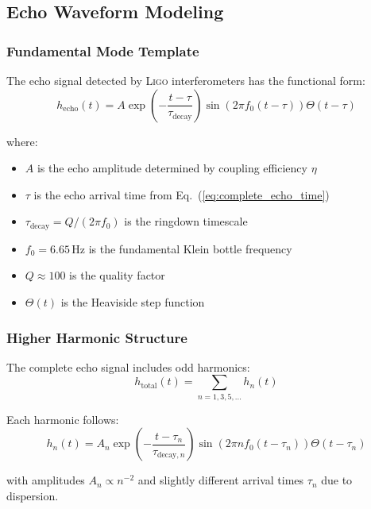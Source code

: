 \documentclass[reprint,amsmath,amssymb,aps,prd]{revtex4-2}
\newcommand{\LIGO}{\textsc{Ligo}\xspace}
\begin{document}
\subsection{Echo Waveform Modeling}

\subsubsection{Fundamental Mode Template}

The echo signal detected by \LIGO interferometers has the functional form:
\begin{equation}
h_{\text{echo}}(t) = A \exp\left(-\frac{t-\tau}{\tau_{\text{decay}}}\right) \sin(2\pi f_0 (t-\tau)) \Theta(t-\tau)
\label{eq:echo_template}
\end{equation}

where:
\begin{itemize}
\item $A$ is the echo amplitude determined by coupling efficiency $\eta$
\item $\tau$ is the echo arrival time from Eq.~(\ref{eq:complete_echo_time})
\item $\tau_{\text{decay}} = Q/(2\pi f_0)$ is the ringdown timescale
\item $f_0 = 6.65\,\text{Hz}$ is the fundamental Klein bottle frequency
\item $Q \approx 100$ is the quality factor
\item $\Theta(t)$ is the Heaviside step function
\end{itemize}

\subsubsection{Higher Harmonic Structure}

The complete echo signal includes odd harmonics:
\begin{equation}
h_{\text{total}}(t) = \sum_{n=1,3,5,\ldots} h_n(t)
\label{eq:total_echo}
\end{equation}

Each harmonic follows:
\begin{equation}
h_n(t) = A_n \exp\left(-\frac{t-\tau_n}{\tau_{\text{decay},n}}\right) \sin(2\pi n f_0 (t-\tau_n)) \Theta(t-\tau_n)
\label{eq:harmonic_template}
\end{equation}

with amplitudes $A_n \propto n^{-2}$ and slightly different arrival times $\tau_n$ due to dispersion.
\end{document}
